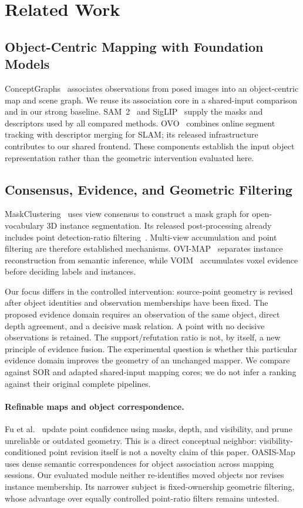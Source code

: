 \section{Related Work}
\subsection{Object-Centric Mapping with Foundation Models}
ConceptGraphs~\cite{gu2024conceptgraphs} associates observations from posed images into an object-centric map and scene graph. We reuse its association core in a shared-input comparison and in our strong baseline. SAM~2~\cite{ravi2024sam2} and SigLIP~\cite{zhai2023siglip} supply the masks and descriptors used by all compared methods. OVO~\cite{martins2025ovo} combines online segment tracking with descriptor merging for SLAM; its released infrastructure contributes to our shared frontend. These components establish the input object representation rather than the geometric intervention evaluated here.

\subsection{Consensus, Evidence, and Geometric Filtering}
MaskClustering~\cite{yan2024maskclustering} uses view consensus to construct a mask graph for open-vocabulary 3D instance segmentation. Its released post-processing already includes point detection-ratio filtering~\cite{maskclustering_pinned_code}. Multi-view accumulation and point filtering are therefore established mechanisms. OVI-MAP~\cite{deng2026ovimap} separates instance reconstruction from semantic inference, while VOIM~\cite{song2026voim} accumulates voxel evidence before deciding labels and instances.

Our focus differs in the controlled intervention: source-point geometry is revised after object identities and observation memberships have been fixed. The proposed evidence domain requires an observation of the same object, direct depth agreement, and a decisive mask relation. A point with no decisive observations is retained. The support/refutation ratio is not, by itself, a new principle of evidence fusion. The experimental question is whether this particular evidence domain improves the geometry of an unchanged mapper. We compare against SOR and adapted shared-input mapping cores; we do not infer a ranking against their original complete pipelines.

\paragraph{Refinable maps and object correspondence.} Fu et al.~\cite{fu2026refinable} update point confidence using masks, depth, and visibility, and prune unreliable or outdated geometry. This is a direct conceptual neighbor: visibility-conditioned point revision itself is not a novelty claim of this paper. OASIS-Map~\cite{oh2026oasis} uses dense semantic correspondences for object association across mapping sessions. Our evaluated module neither re-identifies moved objects nor revises instance membership. Its narrower subject is fixed-ownership geometric filtering, whose advantage over equally controlled point-ratio filters remains untested.
